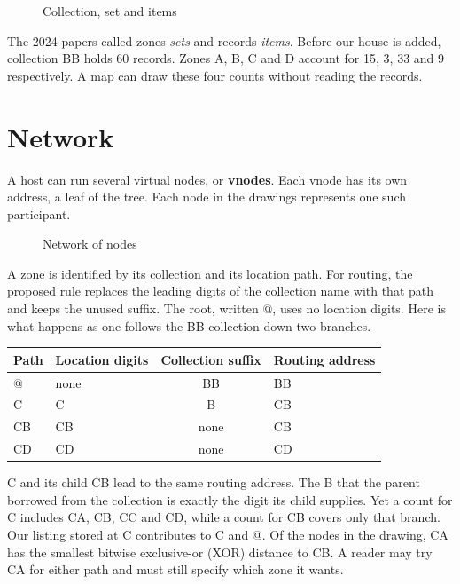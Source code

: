 \documentclass[11pt]{article}
\begin{document}
\begin{figure}[H]
    \centering
    \caption{Collection, set and items}
\end{figure}

The 2024 papers called zones \emph{sets} and records \emph{items}. Before our house is added, collection BB holds 60 records. Zones A, B, C and D account for 15, 3, 33 and 9 respectively. A map can draw these four counts without reading the records.

\section{Network}
A host can run several virtual nodes, or \textbf{vnodes}. Each vnode has its own address, a leaf of the tree. Each node in the drawings represents one such participant.

\begin{figure}[H]
    \centering
    \caption{Network of nodes}
\end{figure}

A zone is identified by its collection and its location path. For routing, the proposed rule replaces the leading digits of the collection name with that path and keeps the unused suffix. The root, written @, uses no location digits. Here is what happens as one follows the BB collection down two branches.

\begin{center}
\begin{tabular}{@{}llcl@{}}
\toprule
Path & Location digits & Collection suffix & Routing address \\
\midrule
@  & none & BB & BB \\
C  & C    & B  & CB \\
CB & CB   & none & CB \\
CD & CD   & none & CD \\
\bottomrule
\end{tabular}
\end{center}

C and its child CB lead to the same routing address. The B that the parent borrowed from the collection is exactly the digit its child supplies. Yet a count for C includes CA, CB, CC and CD, while a count for CB covers only that branch. Our listing stored at C contributes to C and @. Of the nodes in the drawing, CA has the smallest bitwise exclusive-or (XOR) distance to CB. A reader may try CA for either path and must still specify which zone it wants.
\end{document}

